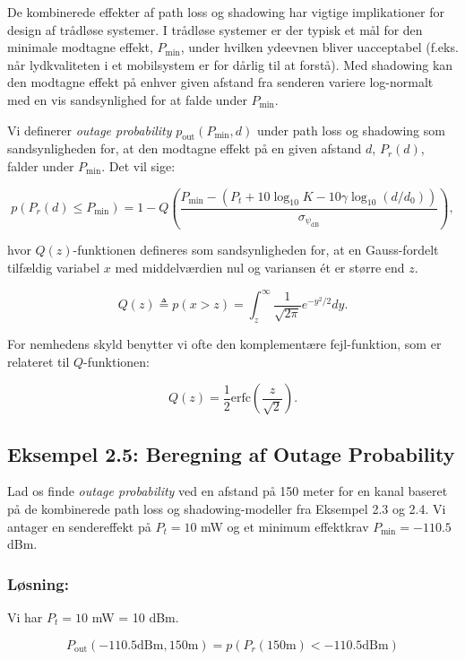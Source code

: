 \documentclass[a4paper,12pt]{book}
\begin{document}
	De kombinerede effekter af path loss og shadowing har vigtige implikationer for design af trådløse systemer. I trådløse systemer er der typisk et mål for den minimale modtagne effekt, \( P_{\text{min}} \), under hvilken ydeevnen bliver uacceptabel (f.eks. når lydkvaliteten i et mobilsystem er for dårlig til at forstå). Med shadowing kan den modtagne effekt på enhver given afstand fra senderen variere log-normalt med en vis sandsynlighed for at falde under \( P_{\text{min}} \).
	
	Vi definerer \textit{outage probability} \( p_{\text{out}}(P_{\text{min}}, d) \) under path loss og shadowing som sandsynligheden for, at den modtagne effekt på en given afstand \( d \), \( P_r(d) \), falder under \( P_{\text{min}} \). Det vil sige:
	
	\[
	p(P_r(d) \leq P_{\text{min}}) = 1 - Q\left(\frac{P_{\text{min}} - \left(P_t + 10 \log_{10} K - 10 \gamma \log_{10}(d/d_0)\right)}{\sigma_{\psi_{\text{dB}}}}\right),
	\]
	
	hvor \( Q(z) \)-funktionen defineres som sandsynligheden for, at en Gauss-fordelt tilfældig variabel \( x \) med middelværdien nul og variansen ét er større end \( z \). 
	
	\[
	Q(z) \triangleq p(x > z) = \int_{z}^{\infty} \frac{1}{\sqrt{2\pi}} e^{-y^2/2} dy.
	\]
	
	For nemhedens skyld benytter vi ofte den komplementære fejl-funktion, som er relateret til \( Q \)-funktionen:
	
	\[
	Q(z) = \frac{1}{2} \text{erfc}\left(\frac{z}{\sqrt{2}}\right).
	\]
	
	\subsection{Eksempel 2.5: Beregning af Outage Probability}
	\noindent Lad os finde \textit{outage probability} ved en afstand på 150 meter for en kanal baseret på de kombinerede path loss og shadowing-modeller fra Eksempel 2.3 og 2.4. Vi antager en sendereffekt på \( P_t = 10 \) mW og et minimum effektkrav \( P_{\text{min}} = -110.5 \) dBm.
	
	\subsubsection*{Løsning:}
	Vi har \( P_t = 10 \) mW = 10 dBm. 
	
	\[
	P_{\text{out}}(-110.5 \text{dBm}, 150 \text{m}) = p(P_r(150 \text{m}) < -110.5 \text{dBm})
	\]
	
\end{document}
